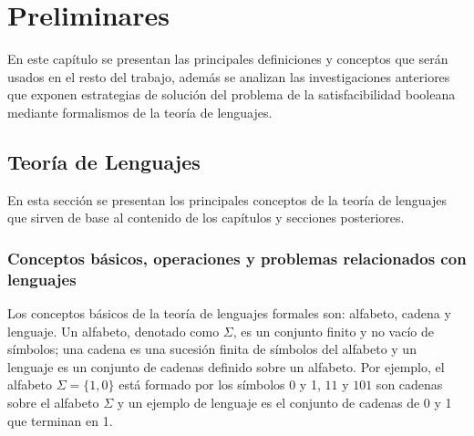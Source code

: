 \chapter{Preliminares}
\label{chap:preliminaries}




En este capítulo se presentan las principales definiciones y conceptos que serán usados en el resto del trabajo, además
se analizan las investigaciones anteriores que exponen estrategias de solución del problema de la satisfacibilidad
booleana  mediante formalismos de la teoría de lenguajes.

\section{Teoría de Lenguajes}

En esta sección se presentan los principales conceptos de la teoría de lenguajes que sirven de base al contenido de los capítulos y secciones posteriores.

\subsection{Conceptos básicos, operaciones y problemas relacionados con lenguajes}

Los conceptos básicos de la teoría de lenguajes formales son: alfabeto, cadena y lenguaje. Un alfabeto, denotado 
como $\Sigma$, es un conjunto finito y no vacío de símbolos; una cadena es una sucesión finita de símbolos del alfabeto y 
un lenguaje es un conjunto de cadenas definido sobre un alfabeto. Por ejemplo, el 
alfabeto $\Sigma=\{1,0\}$ está formado por los símbolos 0 y 1, $11$ y $101$ son cadenas sobre el alfabeto $\Sigma$ y un ejemplo de lenguaje
es  el conjunto de cadenas de 0 y 1 que terminan en 1.

